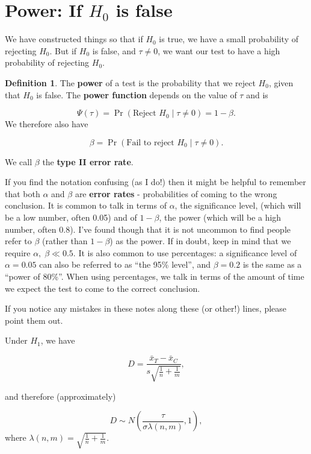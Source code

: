 \documentclass[
  openany]{book}
\theoremstyle{definition}
\newtheorem{definition}{Definition}[chapter]
\theoremstyle{definition}
\theoremstyle{definition}
\theoremstyle{definition}
\theoremstyle{remark}
\begin{document}
\section{\texorpdfstring{Power: If \(H_0\) is false}{Power: If H\_0 is false}}\label{sec-power}

We have constructed things so that if \(H_0\) is true, we have a small probability of rejecting \(H_0\). But if \(H_0\) is false, and \(\tau\neq{0}\), we want our test to have a high probability of rejecting \(H_0\).

\begin{definition}
The \textbf{power} of a test is the probability that we reject \(H_0\), given that \(H_0\) is false. The \textbf{power function} depends on the value of \(\tau\) and is

\[\Psi\left(\tau\right) = \Pr\left(\text{Reject } H_0\mid{\tau\neq{0}}\right) = 1 - \beta.\]
We therefore also have

\[\beta = \Pr\left(\text{Fail to reject } H_0\mid{\tau\neq{0}}\right). \]

We call \(\beta\) the \textbf{type II error rate}.
\end{definition}

If you find the notation confusing (as I do!) then it might be helpful to remember that both \(\alpha\) and \(\beta\) are \textbf{error rates} - probabilities of coming to the wrong conclusion. It is common to talk in terms of \(\alpha\), the significance level, (which will be a low number, often 0.05) and of \(1-\beta\), the power (which will be a high number, often 0.8). I've found though that it is not uncommon to find people refer to \(\beta\) (rather than \(1-\beta\)) as the power. If in doubt, keep in mind that we require \(\alpha,\;\beta \ll 0.5\). It is also common to use percentages: a significance level of \(\alpha=0.05\) can also be referred to as ``the 95\% level'', and \(\beta=0.2\) is the same as a ``power of 80\%''. When using percentages, we talk in terms of the amount of time we expect the test to come to the correct conclusion.

If you notice any mistakes in these notes along these (or other!) lines, please point them out.

Under \(H_1\), we have

\[D = \frac{\bar{x}_T - \bar{x}_C}{s\sqrt{\frac{1}{n} + \frac{1}{m}}},\]

and therefore (approximately)

\[D \sim{N\left(\frac{\tau}{\sigma\lambda\left(n,m\right)}, 1\right)},\]
where \(\lambda\left(n,m\right) = \sqrt{\frac{1}{n}+\frac{1}{m}}\).
\end{document}

